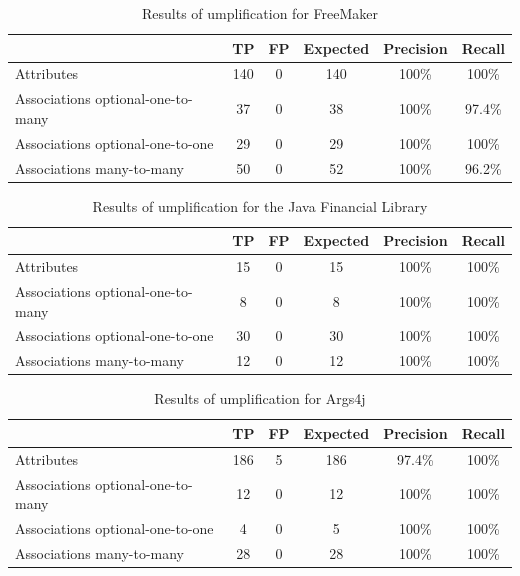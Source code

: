 \begin{table}[h]
\caption{Results of umplification for FreeMaker}
\label{table:umplifiedResultsSystems5}
\begin{tabularx}{\textwidth}{l|ccccc}
\toprule
\rowcolor[HTML]{BBDAFF}
\textbf{} & \textbf{TP}  & \textbf{FP} & \textbf{Expected}  & \textbf{Precision}  & \textbf{Recall}\\ \hline
Attributes & 140  & 0  & 140  & 100\% & 100\% \\ \hline
Associations optional-one-to-many &  37 & 0 & 38 & 100\% & 97.4\% \\
Associations optional-one-to-one &  29 & 0 & 29  & 100\% & 100\% \\ 
Associations many-to-many & 50 & 0 & 52 & 100\% & 96.2\%\\ 
\end{tabularx}
\end{table}

\begin{table}[h]
\caption{Results of umplification for the Java Financial Library}
\label{table:umplifiedResultsSystems6}
\begin{tabularx}{\textwidth}{l|ccccc}
\toprule
\rowcolor[HTML]{BBDAFF}
\textbf{} & \textbf{TP}  & \textbf{FP} & \textbf{Expected}  & \textbf{Precision}  & \textbf{Recall}\\ \hline
Attributes & 15  & 0  & 15  & 100\% & 100\%  \\ \hline
Associations optional-one-to-many &  8 & 0 & 8 & 100\% & 100\%\\
Associations optional-one-to-one &  30 & 0 & 30  & 100\% & 100\% \\ 
Associations many-to-many & 12 & 0 & 12 & 100\% & 100\% \\ 
\end{tabularx}
\end{table}

\begin{table}[h]
\caption{Results of umplification for Args4j}
\label{table:umplifiedResultsSystems7}
\begin{tabularx}{\textwidth}{l|ccccc}
\toprule
\rowcolor[HTML]{BBDAFF}
\textbf{} & \textbf{TP}  & \textbf{FP} & \textbf{Expected}  & \textbf{Precision}  & \textbf{Recall}\\ \hline
Attributes & 186 & 5 & 186 & 97.4\% & 100\%  \\ \hline
Associations optional-one-to-many &  12 & 0 & 12 & 100\% & 100\%\\
Associations optional-one-to-one &  4 & 0 & 5  & 100\% & 100\% \\ 
Associations many-to-many & 28 & 0 & 28 & 100\% & 100\% \\ 
\end{tabularx}
\end{table}

